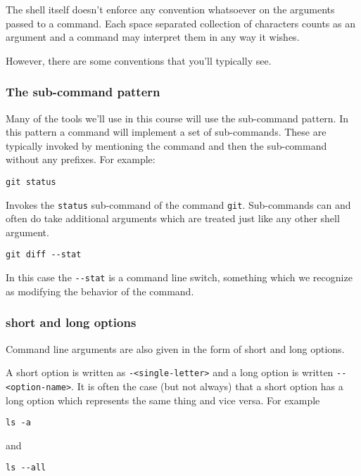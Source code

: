 \documentclass[11pt]{article}
\begin{document}
The shell itself doesn't enforce any convention whatsoever on the
arguments passed to a command. Each space separated collection of
characters counts as an argument and a command may interpret them
in any way it wishes.

However, there are some conventions that you'll typically see.

\subsubsection{The sub-command pattern}
\label{sec:orgf8ad249}

Many of the tools we'll use in this course will use the
sub-command pattern. In this pattern a command will implement a
set of sub-commands. These are typically invoked by mentioning the
command and then the sub-command without any prefixes. For
example:

\begin{verbatim}
git status
\end{verbatim}

Invokes the \texttt{status} sub-command of the command
\texttt{git}. Sub-commands can and often do take additional arguments
which are treated just like any other shell argument.

\begin{verbatim}
git diff --stat
\end{verbatim}

In this case the \texttt{-{}-stat} is a command line switch, something
which we recognize as modifying the behavior of the command.

\subsubsection{short and long options}
\label{sec:orge8b2472}

Command line arguments are also given in the form of short and
long options.

A short option is written as \texttt{-<single-letter>} and a long option
is written \texttt{-{}-<option-name>}. It is often the case (but not
always) that a short option has a long option which represents the
same thing and vice versa. For example

\begin{verbatim}
ls -a
\end{verbatim}

and

\begin{verbatim}
ls --all 
\end{verbatim}
\end{document}
